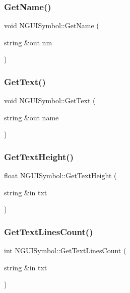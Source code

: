 \subsubsection{\texorpdfstring{Get\+Name()}{GetName()}}
{\footnotesize\ttfamily void N\+G\+U\+I\+Symbol\+::\+Get\+Name (\begin{DoxyParamCaption}\item[{string \&out}]{nm }\end{DoxyParamCaption})}

\hypertarget{class_n_g_u_i_symbol_ac2a29b3154b6a17c28427f9c6fb4f1ac}{}\label{class_n_g_u_i_symbol_ac2a29b3154b6a17c28427f9c6fb4f1ac} 
\subsubsection{\texorpdfstring{Get\+Text()}{GetText()}}
{\footnotesize\ttfamily void N\+G\+U\+I\+Symbol\+::\+Get\+Text (\begin{DoxyParamCaption}\item[{string \&out}]{name }\end{DoxyParamCaption})}

\hypertarget{class_n_g_u_i_symbol_a2cb3dd23d04a59d06ed18c68593a2b88}{}\label{class_n_g_u_i_symbol_a2cb3dd23d04a59d06ed18c68593a2b88} 
\subsubsection{\texorpdfstring{Get\+Text\+Height()}{GetTextHeight()}}
{\footnotesize\ttfamily float N\+G\+U\+I\+Symbol\+::\+Get\+Text\+Height (\begin{DoxyParamCaption}\item[{string \&in}]{txt }\end{DoxyParamCaption})}

\hypertarget{class_n_g_u_i_symbol_a203a93b20c7b7262dfe03e43b050dd8d}{}\label{class_n_g_u_i_symbol_a203a93b20c7b7262dfe03e43b050dd8d} 
\subsubsection{\texorpdfstring{Get\+Text\+Lines\+Count()}{GetTextLinesCount()}}
{\footnotesize\ttfamily int N\+G\+U\+I\+Symbol\+::\+Get\+Text\+Lines\+Count (\begin{DoxyParamCaption}\item[{string \&in}]{txt }\end{DoxyParamCaption})}


